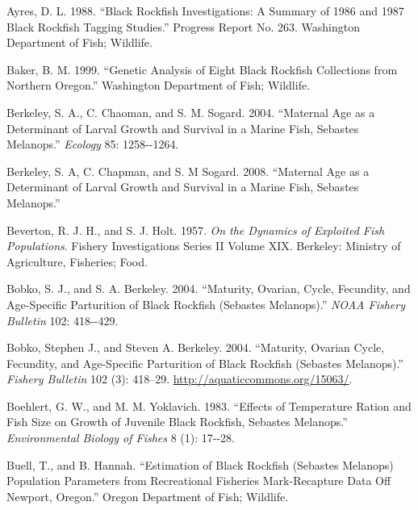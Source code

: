 \documentclass[11pt,
  english,
  letterpaper,
]{article}
\newlength{\cslhangindent}
\newenvironment{CSLReferences}[2] %
 {%
  \setlength{\parindent}{0pt}
  \ifodd #1 \everypar{\setlength{\hangindent}{\cslhangindent}}\ignorespaces\fi
  \ifnum #2 > 0
  \setlength{\parskip}{#2\baselineskip}
  \fi
 }%
 {}
\begin{document}
\hypertarget{refs}{}
\begin{CSLReferences}{1}{0}
\leavevmode{}%
Ayres, D. L. 1988. {``Black Rockfish Investigations: A Summary of 1986 and 1987 Black Rockfish Tagging Studies.''} Progress Report No. 263. Washington Department of Fish; Wildlife.

\leavevmode{}%
Baker, B. M. 1999. {``Genetic Analysis of Eight Black Rockfish Collections from Northern Oregon.''} Washington Department of Fish; Wildlife.

\leavevmode{}%
Berkeley, S. A., C. Chaoman, and S. M. Sogard. 2004. {``Maternal Age as a Determinant of Larval Growth and Survival in a Marine Fish, Sebastes Melanops.''} \emph{Ecology} 85: 1258-\/-1264.

\leavevmode{}%
Berkeley, S. A, C. Chapman, and S. M Sogard. 2008. {``Maternal Age as a Determinant of Larval Growth and Survival in a Marine Fish, Sebastes Melanops.''}

\leavevmode{}%
Beverton, R. J. H., and S. J. Holt. 1957. \emph{On the Dynamics of Exploited Fish Populations}. Fishery {Investigations} {Series II} {Volume XIX}. Berkeley: Ministry of Agriculture, Fisheries; Food.

\leavevmode{}%
Bobko, S. J., and S. A. Berkeley. 2004. {``Maturity, Ovarian, Cycle, Fecundity, and Age-Specific Parturition of Black Rockfish (Sebastes Melanops).''} \emph{NOAA Fishery Bulletin} 102: 418-\/-429.

\leavevmode{}%
Bobko, Stephen J., and Steven A. Berkeley. 2004. {``Maturity, Ovarian Cycle, Fecundity, and Age-Specific Parturition of Black Rockfish (Sebastes Melanops).''} \emph{Fishery Bulletin} 102 (3): 418--29. \url{http://aquaticcommons.org/15063/}.

\leavevmode{}%
Boehlert, G. W., and M. M. Yoklavich. 1983. {``Effects of Temperature Ration and Fish Size on Growth of Juvenile Black Rockfish, Sebastes Melanops.''} \emph{Environmental Biology of Fishes} 8 (1): 17-\/-28.

\leavevmode{}%
Buell, T., and B. Hannah. {``Estimation of Black Rockfish (Sebastes Melanops) Population Parameters from Recreational Fisheries Mark-Recapture Data Off Newport, Oregon.''} Oregon Department of Fish; Wildlife.


\end{CSLReferences}
\end{document}
